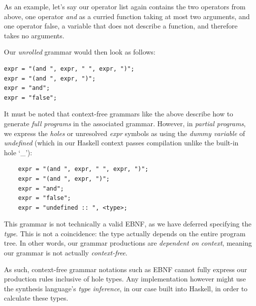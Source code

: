 \documentclass{article}
\begin{document}
As an example, let's say our operator list again contains the two operators from above,
one operator \emph{and} as a curried function taking at most two arguments,
and one operator false, a variable that does not describe a function,
and therefore takes no arguments.

Our \emph{unrolled} grammar would then look as follows:%
    


\begin{verbatim}
expr = "(and ", expr, " ", expr, ")";
expr = "(and ", expr, ")";
expr = "and";
expr = "false";
\end{verbatim}

It must be noted that context-free grammars like the above
describe how to generate \emph{full programs} in the associated grammar.
However,
in \emph{partial programs},
we express the \emph{holes} or unresolved \emph{expr} symbols as
using the \emph{dummy variable} of \emph{undefined}
(which in our Haskell context passes compilation unlike the built-in hole `\_'):

\begin{verbatim}
    expr = "(and ", expr, " ", expr, ")";
    expr = "(and ", expr, ")";
    expr = "and";
    expr = "false";
    expr = "undefined :: ", <type>;
\end{verbatim}

This grammar is not technically a valid EBNF,
as we have deferred specifying the \emph{type}.
This is not a coincidence: the type actually depends on the entire program tree.
In other words, our grammar productions are \emph{dependent on context},
meaning our grammar is not actually \emph{context-free}.

As such, context-free grammar notations such as EBNF cannot fully express our production rules inclusive of hole types.
Any implementation however might use the synthesis language's \emph{type inference},
in our case built into Haskell, in order to calculate these types.
\end{document}
